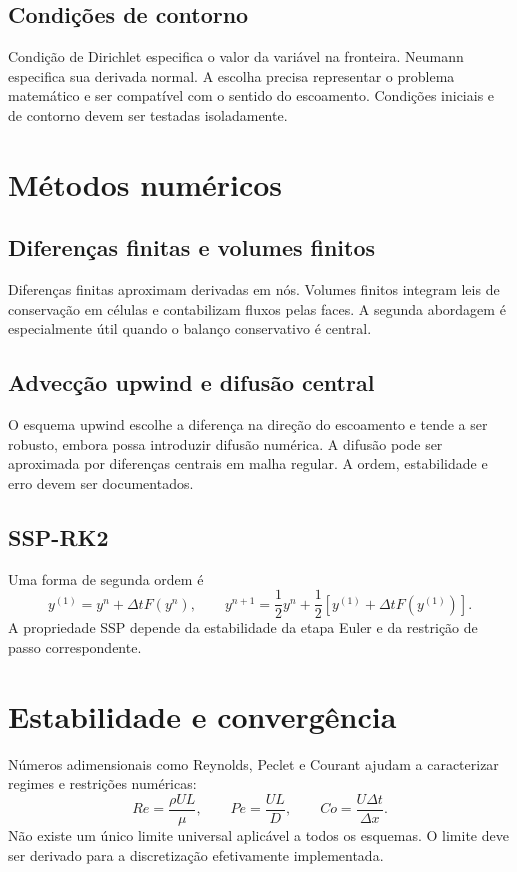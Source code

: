 \documentclass[11pt,a4paper,oneside]{book}
\begin{document}
\section{Condições de contorno}
Condição de Dirichlet especifica o valor da variável na fronteira. Neumann especifica sua derivada normal. A escolha precisa representar o problema matemático e ser compatível com o sentido do escoamento. Condições iniciais e de contorno devem ser testadas isoladamente.

\chapter{Métodos numéricos}
\section{Diferenças finitas e volumes finitos}
Diferenças finitas aproximam derivadas em nós. Volumes finitos integram leis de conservação em células e contabilizam fluxos pelas faces. A segunda abordagem é especialmente útil quando o balanço conservativo é central.

\section{Advecção upwind e difusão central}
O esquema upwind escolhe a diferença na direção do escoamento e tende a ser robusto, embora possa introduzir difusão numérica. A difusão pode ser aproximada por diferenças centrais em malha regular. A ordem, estabilidade e erro devem ser documentados.

\section{SSP-RK2}
Uma forma de segunda ordem é
\[
y^{(1)}=y^n+\Delta t F(y^n),\qquad
y^{n+1}=\frac12 y^n+\frac12\left[y^{(1)}+\Delta t F(y^{(1)})\right].
\]
A propriedade SSP depende da estabilidade da etapa Euler e da restrição de passo correspondente.

\chapter{Estabilidade e convergência}
Números adimensionais como Reynolds, Peclet e Courant ajudam a caracterizar regimes e restrições numéricas:
\[
Re=\frac{\rho U L}{\mu},\qquad
Pe=\frac{UL}{D},\qquad
Co=\frac{U\Delta t}{\Delta x}.
\]
Não existe um único limite universal aplicável a todos os esquemas. O limite deve ser derivado para a discretização efetivamente implementada.
\end{document}
